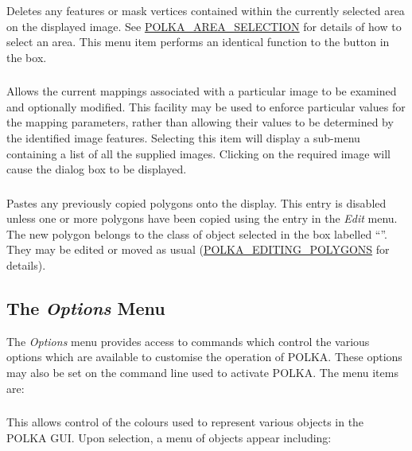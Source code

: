 \subsubsection {} Deletes any features
or mask vertices contained within the currently selected area on the
displayed image. See \hyperref{here}{section }{}{POLKA_AREA_SELECTION}
for details of how to select an area. This menu item performs an
identical function to the  button in
the  box.

\subsubsection {} Allows the current
mappings associated with a particular image to be examined and optionally
modified. This facility may be used to enforce particular values for the
mapping parameters, rather than allowing their values to be determined by
the identified image features. Selecting this item will display a
sub-menu containing a list of all the supplied images. Clicking on the
required image will cause the  dialog box to be displayed.

\subsubsection {} Pastes any previously
copied polygons onto the display. This entry is disabled unless one or
more polygons have been copied using the 
entry in the {\em Edit} menu. The new polygon belongs to the class of
object selected in the box labelled ``''. They may be edited or moved as usual
(\hyperref{go here}{see section }{}{POLKA_EDITING_POLYGONS} for details).

\subsection {The {\em Options} Menu}
The {\em Options} menu provides access to commands which control the
various options which are available to customise the operation of POLKA.
These options may also be set on the command line used to activate 
POLKA. The menu items are:

\subsubsection {} 
This allows control of the colours used to represent various objects in
the POLKA GUI. Upon selection, a menu of objects appear including:

